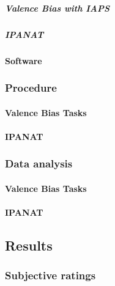 \documentclass[man]{apa6}
\let\oldparagraph\paragraph
\renewcommand{\paragraph}[1]{\oldparagraph{#1}\mbox{}}
\let\oldsubparagraph\subparagraph
\renewcommand{\subparagraph}[1]{\oldsubparagraph{#1}\mbox{}}
\begin{document}
\hypertarget{valence-bias-with-iaps}{%
\subparagraph{Valence Bias with IAPS}\label{valence-bias-with-iaps}}

\hypertarget{ipanat}{%
\subparagraph{IPANAT}\label{ipanat}}

\hypertarget{software-1}{%
\paragraph{Software}\label{software-1}}

\hypertarget{procedure-1}{%
\subsubsection{Procedure}\label{procedure-1}}

\hypertarget{valence-bias-tasks}{%
\paragraph{Valence Bias Tasks}\label{valence-bias-tasks}}

\hypertarget{ipanat-1}{%
\paragraph{IPANAT}\label{ipanat-1}}

\hypertarget{data-analysis}{%
\subsubsection{Data analysis}\label{data-analysis}}

\hypertarget{valence-bias-tasks-1}{%
\paragraph{Valence Bias Tasks}\label{valence-bias-tasks-1}}

\hypertarget{ipanat-2}{%
\paragraph{IPANAT}\label{ipanat-2}}

\hypertarget{results-1}{%
\subsection{Results}\label{results-1}}

\hypertarget{subjective-ratings-1}{%
\subsubsection{Subjective ratings}\label{subjective-ratings-1}}
\end{document}
